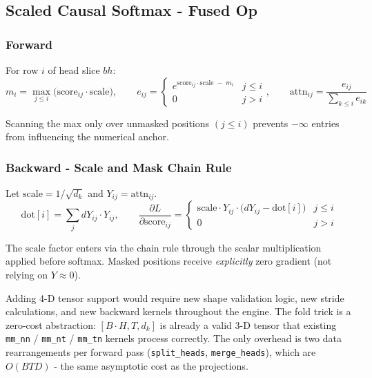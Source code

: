 \documentclass[12pt, a4paper]{article}
\begin{document}
\subsection{Scaled Causal Softmax - Fused Op}

\subsubsection{Forward}

For row \(i\) of head slice \(bh\):
\[
  m_i = \max_{j \le i}\bigl(\text{score}_{ij} \cdot \text{scale}\bigr),
  \qquad
  e_{ij} = \begin{cases} e^{\text{score}_{ij}\cdot\text{scale}\;-\;m_i} & j \le i \\ 0 & j > i \end{cases},
  \qquad
  \text{attn}_{ij} = \frac{e_{ij}}{\displaystyle\sum_{k\le i} e_{ik}}
\]

Scanning the max only over unmasked positions \((j \le i)\) prevents
\(-\infty\) entries from influencing the numerical anchor.

\subsubsection{Backward - Scale and Mask Chain Rule}

Let \(\text{scale} = 1/\sqrt{d_k}\) and \(Y_{ij} = \text{attn}_{ij}\).
\[
  \text{dot}[i] = \sum_j dY_{ij} \cdot Y_{ij},
  \qquad
  \frac{\partial L}{\partial \text{score}_{ij}} =
  \begin{cases}
    \text{scale} \cdot Y_{ij} \cdot \bigl(dY_{ij} - \text{dot}[i]\bigr) & j \le i \\
    0 & j > i
  \end{cases}
\]

The \(\text{scale}\) factor enters via the chain rule through the scalar
multiplication applied before softmax.  Masked positions receive
\emph{explicitly} zero gradient (not relying on \(Y \approx 0\)).

\begin{tcolorbox}[interviewbox,
    title={Interview: Why fold $B \times H$ instead of implementing 4-D matmul?}]
  Adding 4-D tensor support would require new shape validation logic, new
  stride calculations, and new backward kernels throughout the engine.  The
  fold trick is a zero-cost abstraction: \([B \cdot H, T, d_k]\) is already a
  valid 3-D tensor that existing \texttt{mm\_nn} / \texttt{mm\_nt} /
  \texttt{mm\_tn} kernels process correctly.  The only overhead is two data
  rearrangements per forward pass (\texttt{split\_heads}, \texttt{merge\_heads}),
  which are \(O(BTD)\) - the same asymptotic cost as the projections.
\end{tcolorbox}
\end{document}
